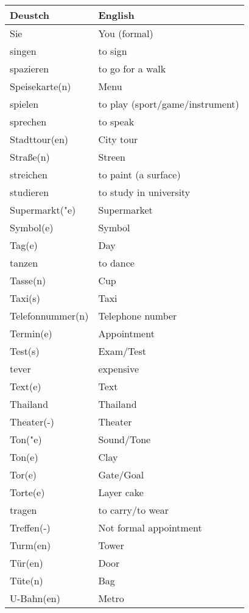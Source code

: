 \documentclass{article}
\renewcommand{\arraystretch}{1}
\begin{document}
\hfill
\begin{minipage}{0.48\textwidth}
    \centering
    \renewcommand{\arraystretch}{1.5}
    \begin{tabular}{|>{\raggedright\arraybackslash}p{3.5cm}|>{\raggedright\arraybackslash}p{3.5cm}|}
        \hline
        \rowcolor{gray!20} \textbf{Deustch} & \textbf{English} \\
        \hline
        Sie & You (formal) \\\hline
        singen & to sign \\\hline
        spazieren & to go for a walk \\\hline
        Speisekarte(n) & Menu \\\hline
        spielen & to play (sport/game/instrument) \\\hline
        sprechen & to speak \\\hline
        Stadttour(en) & City tour \\\hline
        Stra\ss{}e(n) & Streen \\\hline
        streichen & to paint (a surface) \\\hline
        studieren & to study in university \\\hline
        Supermarkt("e) & Supermarket \\\hline
        Symbol(e) & Symbol \\\hline
        Tag(e) & Day \\\hline
        tanzen & to dance \\\hline
        Tasse(n) & Cup \\\hline
        Taxi(s) & Taxi \\\hline
        Telefonnummer(n) & Telephone number \\\hline
        Termin(e) & Appointment \\\hline
        Test(s) & Exam/Test \\\hline
        tever & expensive \\\hline
        Text(e) & Text \\\hline
        Thailand & Thailand \\\hline
        Theater(-) & Theater \\\hline
        Ton("e) & Sound/Tone \\\hline
        Ton(e) & Clay \\\hline
        Tor(e) & Gate/Goal \\\hline
        Torte(e) & Layer cake \\\hline
        tragen & to carry/to wear \\\hline
        Treffen(-) & Not formal appointment \\\hline
        Turm(en) & Tower \\\hline
        Tür(en) & Door \\\hline
        Tüte(n) & Bag \\\hline
        U-Bahn(en) & Metro \\\hline
    \end{tabular}
\end{minipage}
\end{document}

